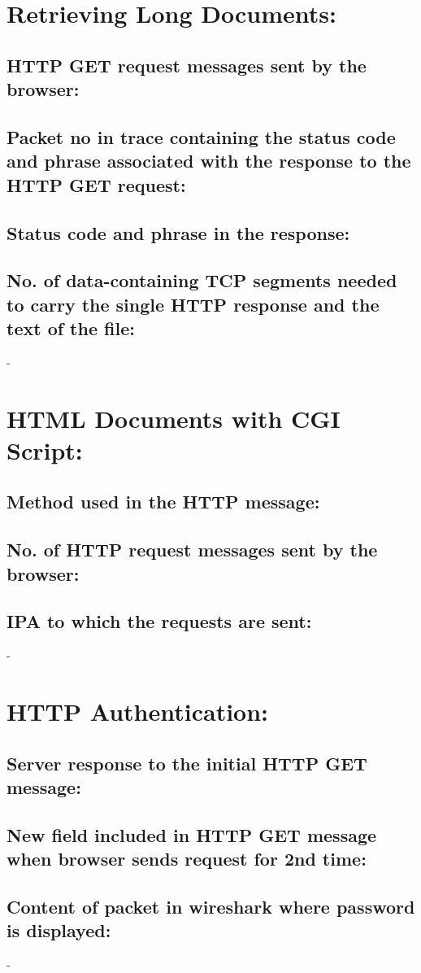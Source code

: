 \documentclass[]{report}
\begin{document}
\section{Retrieving Long Documents:}
\subsection{HTTP GET request messages sent by the browser:}

\subsection{Packet no in trace containing the status code and phrase associated with the response to the HTTP GET request:}

\subsection{Status code and phrase in the response:}

\subsection{No. of data-containing TCP segments needed to carry the single HTTP response and the text of the file:}
-


\section{HTML Documents with CGI Script:}
\subsection{Method used in the HTTP message:}

\subsection{No. of HTTP request messages sent by the browser:}

\subsection{IPA to which the requests are sent:}
-


\section{HTTP Authentication:}
\subsection{Server response to the initial HTTP GET message:}

\subsection{New field included in HTTP GET message when browser sends request for 2nd time:}

\subsection{Content of packet in wireshark where password is displayed:}
-
\end{document}
